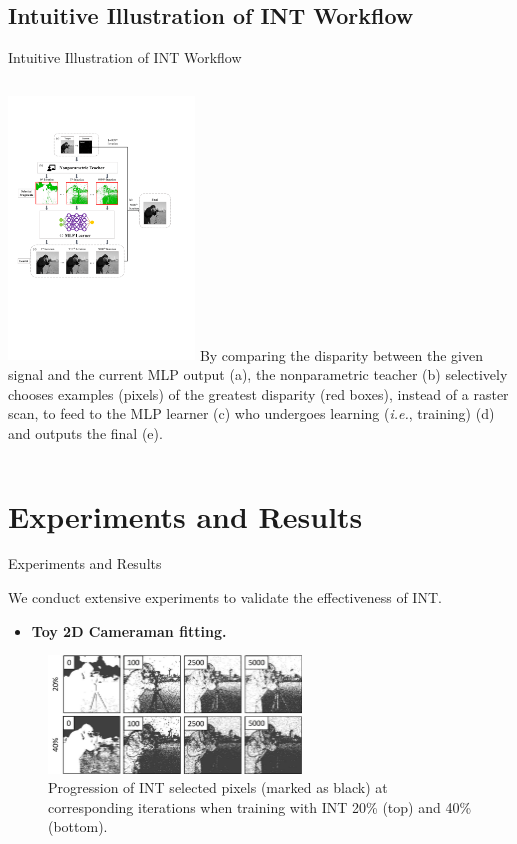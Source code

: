 \documentclass[aspectratio=169,xcolor=dvipsnames]{beamer}
\newcommand{\ie}{\textit{\fontspec{Times New Roman}i.e.}}
\begin{document}
\subsection{Intuitive Illustration of INT Workflow}
\begin{frame}{Intuitive Illustration of INT Workflow}
\begin{columns}
    \centering
    \includegraphics[height=7cm]{Source/figure1.pdf}
    \justify
    By comparing the \alert{disparity} between the given signal and the current MLP output (a), the nonparametric teacher (b) \alert{selectively chooses} examples (pixels) of the \alert{greatest} disparity (red boxes), instead of a raster scan, to feed to the MLP learner (c) who undergoes learning (\ie, training) (d) and outputs the final (e).
\end{columns}
\end{frame}


\section{Experiments and Results}
\begin{frame}{Experiments and Results}

\justify
We conduct extensive experiments to validate the \alert{effectiveness} of INT.

\vspace{1mm}
\begin{itemize}
    \item {\bf Toy 2D Cameraman fitting.}
\end{itemize}

\begin{figure}
  \centering
  \includegraphics[width=0.6\textwidth]{out/sampling_dynamics_camera.pdf}
  \caption{Progression of INT selected pixels (marked as black) at corresponding iterations when training with INT 20\% (top) and 40\% (bottom).}
\end{figure}
\end{frame}
\end{document}
